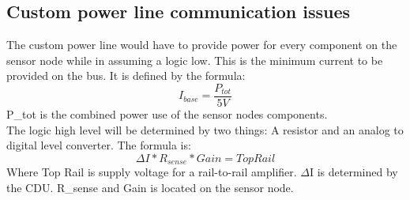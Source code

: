 \subsection{Custom power line communication issues}
The custom power line would have to provide power for every component on the sensor node while in assuming a logic low. This is the minimum current to be provided on the bus. It is defined by the formula:
\begin{equation}
I_{base} = \frac{P_{tot}}{5V}
\end{equation}
P_{tot} is the combined power use of the sensor nodes components.\\
The logic high level will be determined by two things: A resistor and an analog to digital level converter. The formula is:
\begin{equation}
\Delta I * R_{sense} * Gain = Top Rail
\end{equation}
Where Top Rail is supply voltage for a rail-to-rail amplifier. $\Delta$I is determined by the CDU. R_{sense} and Gain is located on the sensor node.
